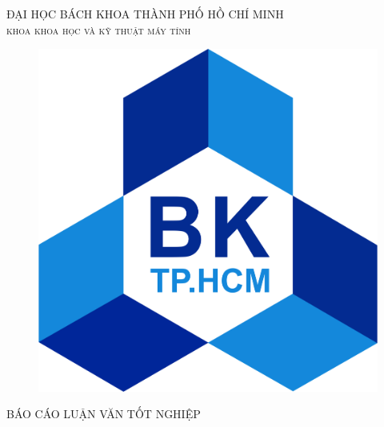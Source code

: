\documentclass[a4paper, 12pt]{article}
\theoremstyle{definition}
\begin{document}
\begin{titlepage}

\newcommand{\HRule}{\rule{\linewidth}{0.5mm}} %

\center %
 

\textsc{\large ĐẠI HỌC BÁCH KHOA THÀNH PHỐ HỒ CHÍ MINH}\\[0.2cm] %
\textsc{\Large \scshape khoa khoa học và kỹ thuật máy tính}\\[0.5cm] %
\begin{figure}[H] 
\centering
\includegraphics[scale=0.4]{hinh/HCMUT_official_logo.png}
\end{figure} 

\textsc{\large BÁO CÁO LUẬN VĂN TỐT NGHIỆP}\\[0.2cm] %



\end{titlepage}
\end{document}
